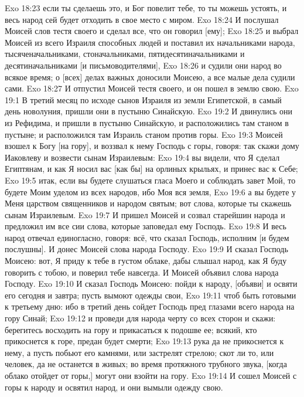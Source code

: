 \vs Exo 18:23 если ты сделаешь это, и Бог повелит тебе, то ты можешь устоять, и весь народ сей будет отходить в свое место с миром.
\vs Exo 18:24 И послушал Моисей слов тестя своего и сделал все, что он говорил [ему];
\vs Exo 18:25 и выбрал Моисей из всего Израиля способных людей и поставил их начальниками народа, тысяченачальниками, стоначальниками, пятидесятиначальниками и десятиначальниками [и письмоводителями],
\vs Exo 18:26 и судили они народ во всякое время; о [всех] делах важных доносили Моисею, а все малые дела судили сами.
\vs Exo 18:27 И отпустил Моисей тестя своего, и он пошел в землю свою.
\vs Exo 19:1 В третий месяц по исходе сынов Израиля из земли Египетской, в самый день новолуния, пришли они в пустыню Синайскую.
\vs Exo 19:2 И двинулись они из Рефидима, и пришли в пустыню Синайскую, и расположились там станом в пустыне; и расположился там Израиль станом против горы.
\rsbpar\vs Exo 19:3 Моисей взошел к Богу [на гору], и воззвал к нему Господь с горы, говоря: так скажи дому Иаковлеву и возвести сынам Израилевым:
\vs Exo 19:4 вы видели, что Я сделал Египтянам, и как Я носил вас [как бы] на орлиных крыльях, и принес вас к Себе;
\vs Exo 19:5 итак, если вы будете слушаться гласа Моего и соблюдать завет Мой, то будете Моим уделом из всех народов, ибо Моя вся земля,
\vs Exo 19:6 а вы будете у Меня царством священников и народом святым; вот слова, которые ты скажешь сынам Израилевым.
\vs Exo 19:7 И пришел Моисей и созвал старейшин народа и предложил им все сии слова, которые заповедал ему Господь.
\vs Exo 19:8 И весь народ отвечал единогласно, говоря: всё, что сказал Господь, исполним [и будем послушны]. И донес Моисей слова народа Господу.
\rsbpar\vs Exo 19:9 И сказал Господь Моисею: вот, Я приду к тебе в густом облаке, дабы слышал народ, как Я буду говорить с тобою, и поверил тебе навсегда. И Моисей объявил слова народа Господу.
\vs Exo 19:10 И сказал Господь Моисею: пойди к народу, [объяви] и освяти его сегодня и завтра; пусть вымоют одежды свои,
\vs Exo 19:11 чтоб быть готовыми к третьему дню: ибо в третий день сойдет Господь пред глазами всего народа на гору Синай;
\vs Exo 19:12 и проведи для народа черту со всех сторон и скажи: берегитесь восходить на гору и прикасаться к подошве ее; всякий, кто прикоснется к горе, предан будет смерти;
\vs Exo 19:13 рука да не прикоснется к нему, а пусть побьют его камнями, или застрелят стрелою; скот ли то, или человек, да не останется в живых; во время протяжного трубного звука, [когда облако отойдет от горы,] могут они взойти на гору.
\vs Exo 19:14 И сошел Моисей с горы к народу и освятил народ, и они вымыли одежду свою.
